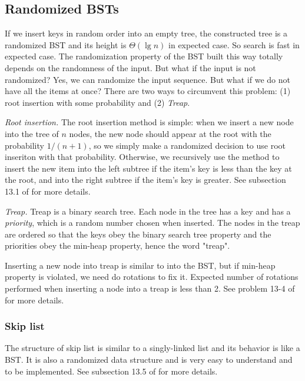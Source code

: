 \documentclass[12pt]{article}
\begin{document}
\subsection{Randomized BSTs}

If we insert keys in random order into an empty tree, the constructed tree
is a randomized BST and its height is $\Theta(\lg n)$ in expected case.  So
search is fast in expected case.  The randomization property of the BST
built this way totally depends on the randomness of the input. But what if
the input is not randomized?  Yes, we can randomize the input sequence.
But what if we do not have all the items at once?  There are two ways to
circumvent this problem: (1) root insertion with some probability and (2)
{\em Treap}.

\emph{Root insertion.}
    The root insertion method is simple: when we insert a new node into the
    tree of $n$ nodes, the new node should appear at the root with the
    probability $1/(n+1)$, so we simply make a randomized decision to use root
    inseriton with that probability.  Otherwise, we recursively use the method
    to insert the new item into the left subtree if the item's key is less than
    the key at the root, and into the right subtree if the item's key is
    greater. See subsection 13.1 of \cite{Sedgewick98} for more details.

\emph{Treap.}
    Treap is a binary search tree.  Each node in the tree has a key and has a
    {\em priority}, which is a random number chosen when inserted.  The nodes
    in the treap are ordered so that the keys obey the binary search tree
    property and the priorities obey the min-heap property, hence the word
    "treap".

    Inserting a new node into treap is similar to into the BST, but if min-heap
    property is violated, we need do rotations to fix it.  Expected number of
    rotations performed when inserting a node into a treap is less than 2.
    See problem 13-4 of \cite{clrs2} for more details.

\subsubsection{Skip list}

The structure of skip list is similar to a singly-linked list and its
behavior is like a BST.  It is also a randomized data structure and is very
easy to understand and to be implemented.  See subsection 13.5 of
\cite{Sedgewick98} for more details.
\end{document}
